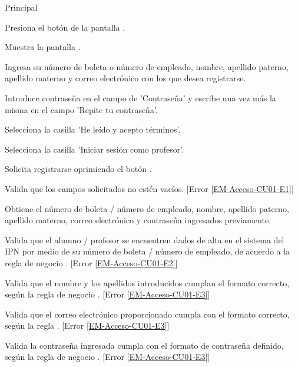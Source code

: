 	\begin{UCtrayectoria}{Principal}

		\UCpaso [\UCactor] Presiona el botón  de la pantalla .

		\UCpaso Muestra la pantalla .

		\UCpaso[\UCactor] Ingresa su número de boleta o número de empleado, nombre, apellido paterno, apellido materno y correo electrónico con los que desea registrarse. \label{l_Acceso_CU1_E1}

	    \UCpaso[\UCactor] Introduce contraseña  en el campo de 'Contraseña' y escribe una vez más la misma en el campo 'Repite tu contraseña'.

	    \UCpaso[\UCactor] Selecciona la casilla 'He leído y acepto términos'.

	    \UCpaso[\UCactor] Selecciona la casilla 'Iniciar sesión como profesor'.  

		\UCpaso [\UCactor] Solicita registrarse oprimiendo el botón .

		\UCpaso Valida que los campos solicitados no estén vacíos. [Error \ref{EM-Acceso-CU01-E1}] \label{Almacenainfo}

		\UCpaso Obtiene el número de boleta / número de empleado, nombre, apellido paterno, apellido materno, correo electrónico y contraseña ingresados previamente.

		\UCpaso Valida que el alumno / profesor se encuentren dados de alta en el sistema del IPN por medio de su número de boleta / número de empleado, de acuerdo a la regla de negocio . [Error \ref{EM-Acceso-CU01-E2}]

		\UCpaso Valida que el nombre y los apellidos introducidos cumplan el formato correcto, según la regla de negocio . [Error \ref{EM-Acceso-CU01-E3}]

	    \UCpaso Valida que el correo electrónico proporcionado cumpla con el formato correcto, según la regla . [Error  \ref{EM-Acceso-CU01-E3}]

	    \UCpaso Valida la contraseña ingresada cumpla con el formato de contraseña definido, según la regla de negocio . [Error  \ref{EM-Acceso-CU01-E3}]


\end{UCtrayectoria}
